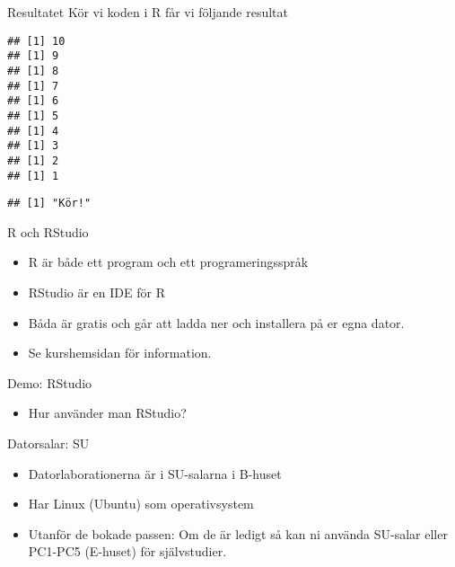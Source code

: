\documentclass[
  10pt,
  ignorenonframetext,
]{beamer}
\providecommand{\tightlist}{%
  \setlength{\itemsep}{0pt}\setlength{\parskip}{0pt}}
\begin{document}

\begin{frame}[fragile]{Resultatet}
\protect\hypertarget{resultatet}{}
Kör vi koden i R får vi följande resultat

\begin{verbatim}
## [1] 10
## [1] 9
## [1] 8
## [1] 7
## [1] 6
## [1] 5
## [1] 4
## [1] 3
## [1] 2
## [1] 1
\end{verbatim}

\begin{verbatim}
## [1] "Kör!"
\end{verbatim}
\end{frame}


\begin{frame}{R och RStudio}
\protect\hypertarget{r-och-RStudio}{}
\begin{itemize}
\tightlist
\item
  R är både ett program och ett programeringsspråk
\item
  RStudio är en IDE för R
\item
  Båda är gratis och går att ladda ner och installera på er egna dator.
\item
  Se kurshemsidan för information.
\end{itemize}
\end{frame}


\begin{frame}{Demo: RStudio}
\begin{itemize}
\tightlist
\item
  Hur använder man RStudio?
\end{itemize}
\end{frame}



\begin{frame}{Datorsalar: SU}
\begin{itemize}
\tightlist
\item
  Datorlaborationerna är i SU-salarna i B-huset
\item
  Har Linux (Ubuntu) som operativsystem
\item
  Utanför de bokade passen: Om de är ledigt så kan ni använda SU-salar eller PC1-PC5 (E-huset) för självstudier.
\end{itemize}
\end{frame}


\end{document}
